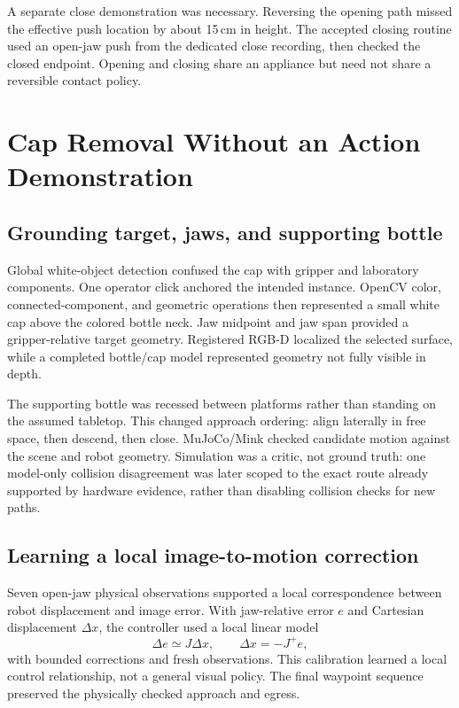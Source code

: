A separate close demonstration was necessary. Reversing the opening path
missed the effective push location by about 15\,cm in height. The accepted
closing routine used an open-jaw push from the dedicated close recording,
then checked the closed endpoint. Opening and closing share an appliance but
need not share a reversible contact policy.

\section{Cap Removal Without an Action Demonstration}
\subsection{Grounding target, jaws, and supporting bottle}
Global white-object detection confused the cap with gripper and laboratory
components. One operator click anchored the intended instance. OpenCV color,
connected-component, and geometric operations then represented a small white
cap above the colored bottle neck. Jaw midpoint and jaw span provided a
gripper-relative target geometry. Registered RGB-D localized the selected
surface, while a completed bottle/cap model represented geometry not fully
visible in depth.

The supporting bottle was recessed between platforms rather than standing on
the assumed tabletop. This changed approach ordering: align laterally in free
space, then descend, then close. MuJoCo/Mink checked candidate motion against
the scene and robot geometry. Simulation was a critic, not ground truth: one
model-only collision disagreement was later scoped to the exact route already
supported by hardware evidence, rather than disabling collision checks for
new paths.

\subsection{Learning a local image-to-motion correction}
Seven open-jaw physical observations supported a local correspondence between
robot displacement and image error. With jaw-relative error $e$ and Cartesian
displacement $\Delta x$, the controller used a local linear model
\begin{equation}
 \Delta e\simeq J\Delta x,\qquad \Delta x=-J^+e,
\label{eq:jacobian}
\end{equation}
with bounded corrections and fresh observations. This calibration learned a
local control relationship, not a general visual policy. The final waypoint
sequence preserved the physically checked approach and egress.

